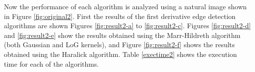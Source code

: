 \documentclass{ipol}
\numberwithin{equation}{section}
\numberwithin{table}{section}
\begin{document}
Now the performance of each algorithm is analyzed using a natural image shown in Figure \ref{fig:original2}. 
First the results of the first derivative edge detection algorithms are shown Figures \ref{fig:result2-a} to \ref{fig:result2-c}. Figures \ref{fig:result2-d} and \ref{fig:result2-e} show the results obtained using the Marr-Hildreth algorithm (both Gaussian and LoG kernels), and Figure \ref{fig:result2-f} shows the results obtained using the Haralick algorithm. Table \ref{exectime2} shows the execution time for each of the algorithms. 

\begin{figure}[h!]
	\centering
	\quad
	
	\quad


\end{figure}
\end{document}
